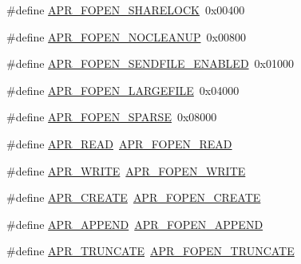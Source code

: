 \begin{DoxyCompactItemize}
\item 
\#define \mbox{\hyperlink{group__apr__file__open__flags_ga426f6e2a8457ab410d99248269059a18}{A\+P\+R\+\_\+\+F\+O\+P\+E\+N\+\_\+\+S\+H\+A\+R\+E\+L\+O\+CK}}~0x00400
\item 
\#define \mbox{\hyperlink{group__apr__file__open__flags_ga3fc9b5a7791d9f462997cd29de67eb80}{A\+P\+R\+\_\+\+F\+O\+P\+E\+N\+\_\+\+N\+O\+C\+L\+E\+A\+N\+UP}}~0x00800
\item 
\#define \mbox{\hyperlink{group__apr__file__open__flags_ga60c21e28e4a612d58a874fe2cc71a6e4}{A\+P\+R\+\_\+\+F\+O\+P\+E\+N\+\_\+\+S\+E\+N\+D\+F\+I\+L\+E\+\_\+\+E\+N\+A\+B\+L\+ED}}~0x01000
\item 
\#define \mbox{\hyperlink{group__apr__file__open__flags_gaf6cfaa4789e6264afd186235f0adbc22}{A\+P\+R\+\_\+\+F\+O\+P\+E\+N\+\_\+\+L\+A\+R\+G\+E\+F\+I\+LE}}~0x04000
\item 
\#define \mbox{\hyperlink{group__apr__file__open__flags_ga0d155e9bb7fbf1a5cd4e84b5ede059f4}{A\+P\+R\+\_\+\+F\+O\+P\+E\+N\+\_\+\+S\+P\+A\+R\+SE}}~0x08000
\item 
\#define \mbox{\hyperlink{group__apr__file__open__flags_ga0021db78d799d1c8825b701c7efee483}{A\+P\+R\+\_\+\+R\+E\+AD}}~\mbox{\hyperlink{group__apr__file__open__flags_gaf9e7303f028b130ff7d4b209d6662d7d}{A\+P\+R\+\_\+\+F\+O\+P\+E\+N\+\_\+\+R\+E\+AD}}
\item 
\#define \mbox{\hyperlink{group__apr__file__open__flags_ga3e427e53aceb1ccdb078d9a03cd63d01}{A\+P\+R\+\_\+\+W\+R\+I\+TE}}~\mbox{\hyperlink{group__apr__file__open__flags_gac598bb95fc9476b0bf2ed0b1c308842c}{A\+P\+R\+\_\+\+F\+O\+P\+E\+N\+\_\+\+W\+R\+I\+TE}}
\item 
\#define \mbox{\hyperlink{group__apr__file__open__flags_gac210e96bc821dbaa83c326e775dad028}{A\+P\+R\+\_\+\+C\+R\+E\+A\+TE}}~\mbox{\hyperlink{group__apr__file__open__flags_gafe94f21ccbf411172e70e7f473af251a}{A\+P\+R\+\_\+\+F\+O\+P\+E\+N\+\_\+\+C\+R\+E\+A\+TE}}
\item 
\#define \mbox{\hyperlink{group__apr__file__open__flags_ga26d3de2bae5c90e5124869f56c141c2e}{A\+P\+R\+\_\+\+A\+P\+P\+E\+ND}}~\mbox{\hyperlink{group__apr__file__open__flags_ga45f353db9b71d4760a3f35cf3781cfc8}{A\+P\+R\+\_\+\+F\+O\+P\+E\+N\+\_\+\+A\+P\+P\+E\+ND}}
\item 
\#define \mbox{\hyperlink{group__apr__file__open__flags_gaa8898fdebd69d3a64286731b713a6dc9}{A\+P\+R\+\_\+\+T\+R\+U\+N\+C\+A\+TE}}~\mbox{\hyperlink{group__apr__file__open__flags_ga09b05a5bd5db534b93794f7657bcb146}{A\+P\+R\+\_\+\+F\+O\+P\+E\+N\+\_\+\+T\+R\+U\+N\+C\+A\+TE}}
\item 

\end{DoxyCompactItemize}
